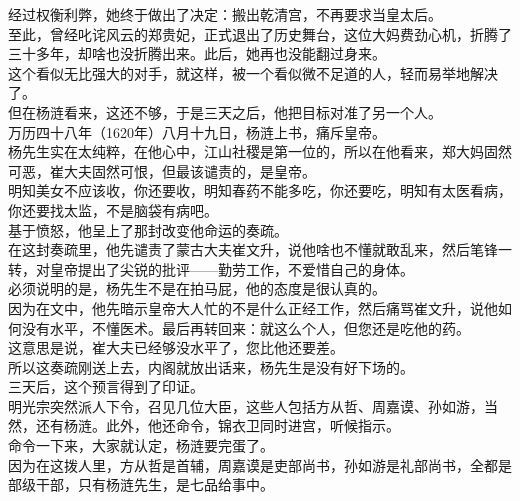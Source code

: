\begin{multicols}{\theparacolNo}
经过权衡利弊，她终于做出了决定：搬出乾清宫，不再要求当皇太后。\\

至此，曾经叱诧风云的郑贵妃，正式退出了历史舞台，这位大妈费劲心机，折腾了三十多年，却啥也没折腾出来。此后，她再也没能翻过身来。\\

这个看似无比强大的对手，就这样，被一个看似微不足道的人，轻而易举地解决了。\\

但在杨涟看来，这还不够，于是三天之后，他把目标对准了另一个人。\\

万历四十八年（1620年）八月十九日，杨涟上书，痛斥皇帝。\\

杨先生实在太纯粹，在他心中，江山社稷是第一位的，所以在他看来，郑大妈固然可恶，崔大夫固然可恨，但最该谴责的，是皇帝。\\

明知美女不应该收，你还要收，明知春药不能多吃，你还要吃，明知有太医看病，你还要找太监，不是脑袋有病吧。\\

基于愤怒，他呈上了那封改变他命运的奏疏。\\

在这封奏疏里，他先谴责了蒙古大夫崔文升，说他啥也不懂就敢乱来，然后笔锋一转，对皇帝提出了尖锐的批评——勤劳工作，不爱惜自己的身体。\\

必须说明的是，杨先生不是在拍马屁，他的态度是很认真的。\\

因为在文中，他先暗示皇帝大人忙的不是什么正经工作，然后痛骂崔文升，说他如何没有水平，不懂医术。最后再转回来：就这么个人，但您还是吃他的药。\\

这意思是说，崔大夫已经够没水平了，您比他还要差。\\

所以这奏疏刚送上去，内阁就放出话来，杨先生是没有好下场的。\\

三天后，这个预言得到了印证。\\

明光宗突然派人下令，召见几位大臣，这些人包括方从哲、周嘉谟、孙如游，当然，还有杨涟。此外，他还命令，锦衣卫同时进宫，听候指示。\\

命令一下来，大家就认定，杨涟要完蛋了。\\

因为在这拨人里，方从哲是首辅，周嘉谟是吏部尚书，孙如游是礼部尚书，全都是部级干部，只有杨涟先生，是七品给事中。\\


\end{multicols}
